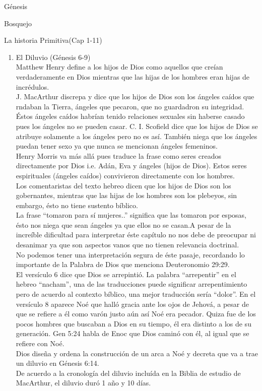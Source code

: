 \begin{section}{Génesis}
\begin{subsection}{Bosquejo}
\begin{subsubsection}{La historia Primitiva(Cap 1-11)}
\begin{enumerate}
\item El Diluvio (Génesis 6-9)\\
Matthew Henry define a los hijos de Dios como aquellos que creían verdaderamente en Dios mientras que las hijas de los hombres eran hijas de incrédulos.\\
J. MacArthur discrepa y dice que los hijos de Dios son los ángeles caídos que rndaban la Tierra, ángeles que pecaron, que no guardadron su integridad. Éstos ángeles caídos habrían tenido relaciones sexuales sin haberse casado pues los ángeles no se pueden casar.
C. I. Scofield dice que los hijos de Dios se atribuye solamente a los ángeles pero no es así. También niega que los ángeles puedan tener sexo ya que nunca se mencionan ángeles femeninos.\\
Henry Morris va más allá pues traduce la frase como seres creados directamente por Dios i.e. Adán, Eva y ángeles (hijos de Dios). Estos seres espirituales (ángeles caídos) convivieron directamente con los hombres.\\
Los comentaristas del texto hebreo dicen que los hijos de Dios son los gobernantes, mientras que las hijas de los hombres son los plebeyos, sin embargo, ésto no tiene sustento bíblico.\\
La frase ``tomaron para sí mujeres..'' significa que las tomaron por esposas, ésto nos niega que sean ángeles ya que ellos no se casan.A pesar de la increíble dificultad para interpretar éste capítulo no nos debe de preocupar ni desanimar ya que son aspectos vanos que no tienen relevancia doctrinal.\\
No podemos tener una interpretación segura de éste pasaje, recordando lo importante de la Palabra de Dios que menciona Deuteronomio 29:29.\\
El versículo 6 dice que Dios se arrepintió. La palabra ``arrepentir'' en el hebreo ``nacham'', una de las traducciones puede significar arrepentimiento pero de acuerdo al contexto bíblico, una mejor traducción sería ``dolor''.\newpage
En el versículo 8 aparece Noé que halló gracia ante los ojos de Jehová, a pesar de que se refiere a él como varón justo aún así Noé era pecador. Quiza fue de los pocos hombres que buscaban a Dios en su tiempo, él era distinto a los de su generación. Gen 5:24 habla de Enoc que Dios caminó con él, al igual que se refiere con Noé. \\
Dios diseña y ordena la construcción de un arca a Noé y decreta que va a trae un diluvio en Génesis 6:14.\\ 
De acuerdo a la cronología del diluvio incluída en la Biblia de estudio de MacArthur, el diluvio duró 1 año y 10 días.\\

\end{enumerate}
\end{subsubsection}
\end{subsection}
\end{section}
